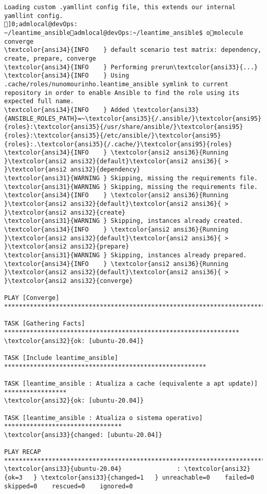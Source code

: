 \documentclass{scrartcl}
\begin{document}
\begin{Verbatim}
Loading custom .yamllint config file, this extends our internal yamllint config.
]0;admlocal@devOps: ~/leantime_ansibleadmlocal@devOps:~/leantime_ansible$ omolecule converge
\textcolor{ansi34}{INFO    } default scenario test matrix: dependency, create, prepare, converge
\textcolor{ansi34}{INFO    } Performing prerun\textcolor{ansi33}{...}
\textcolor{ansi34}{INFO    } Using .cache/roles/nunomourinho.leantime_ansible symlink to current repository in order to enable Ansible to find the role using its expected full name.
\textcolor{ansi34}{INFO    } Added \textcolor{ansi33}{ANSIBLE_ROLES_PATH}=~\textcolor{ansi35}{/.ansible/}\textcolor{ansi95}{roles}:\textcolor{ansi35}{/usr/share/ansible/}\textcolor{ansi95}{roles}:\textcolor{ansi35}{/etc/ansible/}\textcolor{ansi95}{roles}:.\textcolor{ansi35}{/.cache/}\textcolor{ansi95}{roles}
\textcolor{ansi34}{INFO    } \textcolor{ansi2 ansi36}{Running }\textcolor{ansi2 ansi32}{default}\textcolor{ansi2 ansi36}{ > }\textcolor{ansi2 ansi32}{dependency}
\textcolor{ansi31}{WARNING } Skipping, missing the requirements file.
\textcolor{ansi31}{WARNING } Skipping, missing the requirements file.
\textcolor{ansi34}{INFO    } \textcolor{ansi2 ansi36}{Running }\textcolor{ansi2 ansi32}{default}\textcolor{ansi2 ansi36}{ > }\textcolor{ansi2 ansi32}{create}
\textcolor{ansi31}{WARNING } Skipping, instances already created.
\textcolor{ansi34}{INFO    } \textcolor{ansi2 ansi36}{Running }\textcolor{ansi2 ansi32}{default}\textcolor{ansi2 ansi36}{ > }\textcolor{ansi2 ansi32}{prepare}
\textcolor{ansi31}{WARNING } Skipping, instances already prepared.
\textcolor{ansi34}{INFO    } \textcolor{ansi2 ansi36}{Running }\textcolor{ansi2 ansi32}{default}\textcolor{ansi2 ansi36}{ > }\textcolor{ansi2 ansi32}{converge}

PLAY [Converge] ***********************************************************************

TASK [Gathering Facts] ****************************************************************
\textcolor{ansi32}{ok: [ubuntu-20.04]}

TASK [Include leantime_ansible] *******************************************************

TASK [leantime_ansible : Atualiza a cache (equivalente a apt update)] *****************
\textcolor{ansi32}{ok: [ubuntu-20.04]}

TASK [leantime_ansible : Atualiza o sistema operativo] ********************************
\textcolor{ansi33}{changed: [ubuntu-20.04]}

PLAY RECAP ****************************************************************************
\textcolor{ansi33}{ubuntu-20.04}               : \textcolor{ansi32}{ok=3   } \textcolor{ansi33}{changed=1   } unreachable=0    failed=0    skipped=0    rescued=0    ignored=0


\end{Verbatim}
\end{document}
